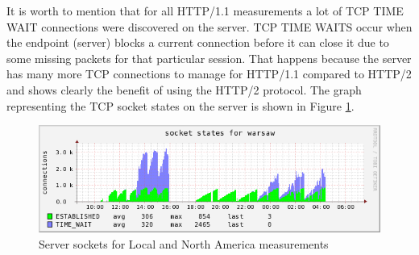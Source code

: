 It is worth to mention that for all HTTP/1.1 measurements a lot of TCP TIME WAIT connections were discovered on the server. TCP TIME WAITS occur when the endpoint (server) blocks a current connection before it can close it due to some missing packets for that particular session. That happens because the server has many more TCP connections to manage for HTTP/1.1 compared to HTTP/2 and shows clearly the benefit of using the HTTP/2 protocol. 
The graph representing the TCP socket states on the server is shown in Figure \ref{fig:sockets}.

\begin{figure}[H]
\centering
\includegraphics[scale=0.6,trim=0.0cm .0cm .0cm .0cm,clip]{images/sockets.png}
\caption{Server sockets for Local and North America measurements}
\label{fig:sockets}
\end{figure}